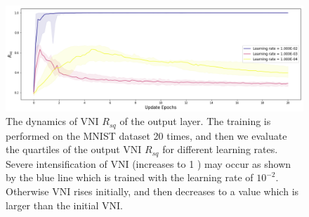 \begin{figure}
\centering

\newcommand{\myWidth}{0.98\linewidth}
\includegraphics[width=\myWidth]{img/Sec5/sim1/dynamics_e20}
\caption[The dynamics of VNI $R_{sq}$ of the output layer.]
{
The dynamics of VNI $R_{sq}$ of the output layer.
The training is performed on the MNIST dataset 20 times, and then we evaluate the quartiles of the output VNI $R_{sq}$
for different learning rates.
Severe intensification of VNI (increases to 1 ) may occur as shown by the blue line which is trained with the learning rate of $10^{-2}$.
Otherwise VNI rises initially, and then decreases to a value which is larger than the initial VNI.
}
\label{fig:sec5_sim1}
\end{figure}
